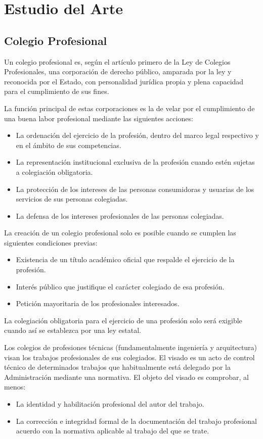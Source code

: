 \chapter{Estudio del Arte}

\section{Colegio Profesional}
Un colegio profesional es, según el artículo primero de la Ley de Colegios Profesionales, una corporación de derecho público, amparada por la ley y reconocida por el Estado, con personalidad jurídica propia y plena capacidad para el cumplimiento de sus fines\cite{colegiosjunta}.

La función principal de estas corporaciones es la de velar por el cumplimiento de una buena labor profesional mediante las siguientes acciones:
\begin{itemize}
\item La ordenación del ejercicio de la profesión, dentro del marco legal respectivo y en el ámbito de sus competencias.
\item La representación institucional exclusiva de la profesión cuando estén sujetas a colegiación obligatoria.
\item La protección de los intereses de las personas consumidoras y usuarias de los servicios de sus personas colegiadas.
\item La defensa de los intereses profesionales de las personas colegiadas.
\end{itemize}

La creación de un colegio profesional solo es posible cuando se cumplen las siguientes condiciones previas:
\begin{itemize}
\item Existencia de un título académico oficial que respalde el ejercicio de la profesión.
\item Interés público que justifique el carácter colegiado de esa profesión.
\item Petición mayoritaria de los profesionales interesados.
\end{itemize}

La colegiación obligatoria para el ejercicio de una profesión solo será exigible cuando así se establezca por una ley estatal.

Los colegios de profesiones técnicas (fundamentalmente ingeniería y arquitectura) visan los trabajos profesionales de sus colegiados. El visado es un acto de control técnico de determinados trabajos que habitualmente está delegado por la Administración mediante una normativa\cite{colegioswikipedia}. El objeto del visado es comprobar, al menos:
\begin{itemize}
\item La identidad y habilitación profesional del autor del trabajo.
\item La corrección e integridad formal de la documentación del trabajo profesional acuerdo con la normativa aplicable al trabajo del que se trate.
\end{itemize}


